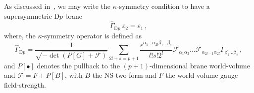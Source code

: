 \documentclass[debug]{phd}
\begin{document}
As discussed in~\cite{Martucci:2011dn}, we may write the $\kappa$-symmetry condition to have a supersymmetric $\mathrm{D}p$-brane 
%
	\begin{equation} 
		\hat{\Gamma}_{\mathrm{D}p}\ \varepsilon_2 =\varepsilon_1\, ,
	\end{equation} 
%
where, the $\kappa$-symmetry operator is defined as~\cite{BT97, Marolf:2003vf} 
%
	\begin{equation} 
	\label{eq:brane_kappa}
		\hat{\Gamma}_{\mathrm{D}p}=\frac{1}{\sqrt{-\det\left( P[G]+\mathcal{F} \right)}} \sum_{2l+s=p+1}\frac{\epsilon^{\alpha _1 \ldots \alpha _{2l}\beta_1 \ldots \beta_s}}{l!s!2^l} \mathcal{F}_{\alpha _1\alpha _2} \ldots \mathcal{F}_{\alpha _{2l-1}\alpha _{2l}} \Gamma_{\beta_1 \ldots \beta_s}\, ,
	\end{equation} 
%
and $P[\bullet]$ denotes the pullback to the $(p+1)$-dimensional brane world-volume and $\mathcal{F}= F + P[B]$, with $B$ the NS two-form and $F$ the world-volume gauge field-strength.
\end{document}
